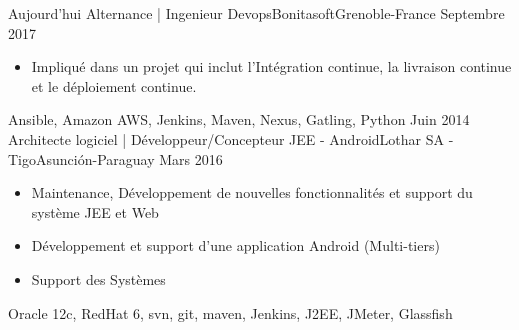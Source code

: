 %
%
%
\begin{experiences}
  \experience
    {Aujourd'hui}   {Alternance | Ingenieur Devops}{Bonitasoft}{Grenoble-France}
    {Septembre 2017} {
                      \begin{itemize}
                        \item Impliqué dans un projet qui inclut l'Intégration continue, la livraison continue et le déploiement continue.
                      \end{itemize}
                    }
                    {Ansible, Amazon AWS, Jenkins, Maven, Nexus, Gatling, Python}
  \emptySeparator
  \experience
    {Juin 2014}   {Architecte logiciel | Développeur/Concepteur JEE - Android}{Lothar SA - Tigo}{Asunción-Paraguay}
    {Mars 2016} {
                      \begin{itemize}
                        \item Maintenance, Développement de nouvelles fonctionnalités et support du système JEE et Web
                        \item Développement et support d'une application Android (Multi-tiers)
                        \item Support des Systèmes
                      \end{itemize}

				}{Oracle 12c, RedHat 6, svn, git, maven, Jenkins, J2EE, JMeter, Glassfish}
  \emptySeparator


\end{experiences}
